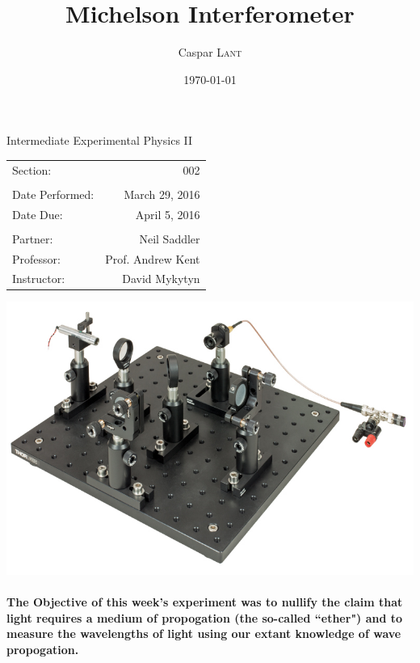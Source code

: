 \documentclass{amsart}
\title{Michelson Interferometer}
\author{Caspar \textsc{Lant}} %
\date{\today} %
\begin{document}
\bigskip

\maketitle %
\begin{center}
    Intermediate Experimental Physics II\\
    \vspace{.7cm}
    \begin{tabular}{l r}
        Section: & 002\\
        \\
        Date Performed: & March 29, 2016 \\ %
        Date Due: & April 5, 2016\\
        \\
        Partner: & Neil Saddler\\ %
        Professor: & Prof. Andrew Kent\\
        Instructor: & David Mykytyn %
    \end{tabular}
    \vfill
    \includegraphics[width=\textwidth]{picture.jpg}
    \vfill
\end{center}

\pagebreak
{}
\paragraph{\textbf{The Objective} of this week's experiment was to nullify the claim that light requires a medium of propogation (the so-called ``ether") and to measure the wavelengths of light using our extant knowledge of wave propogation.}
\end{document}
